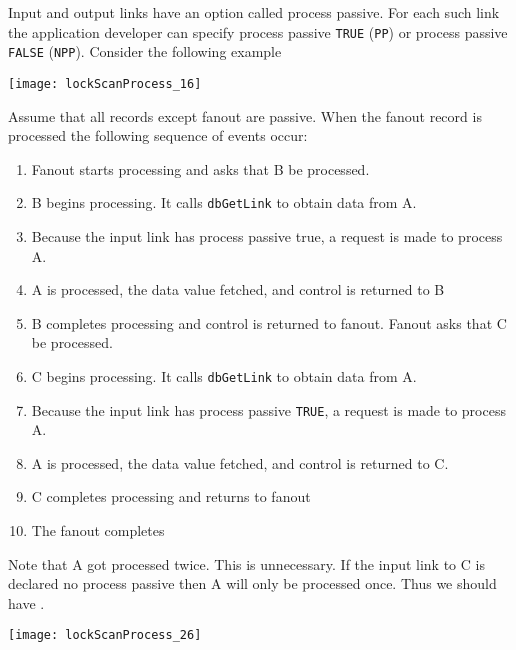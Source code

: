 Input and output links have an option called process passive. For each such link the application developer can specify 
process passive \verb|TRUE| (\verb|PP|) or process passive \verb|FALSE| (\verb|NPP|). Consider the following example 

\begin{center}
\texttt{[image: lockScanProcess\_16]}
\end{center}

Assume that all records except fanout are passive. When the fanout record is processed the following sequence of events 
occur:

\begin{enumerate}
\item Fanout starts processing and asks that B be processed.

\item B begins processing. It calls \verb|dbGetLink| to obtain data from A.

\item Because the input link has process passive true, a request is made to process A.

\item A is processed, the data value fetched, and control is returned to B

\item B completes processing and control is returned to fanout. Fanout asks that C be processed.

\item C begins processing. It calls \verb|dbGetLink| to obtain data from A.

\item Because the input link has process passive \verb|TRUE|, a request is made to process A.

\item A is processed, the data value fetched, and control is returned to C.

\item C completes processing and returns to fanout

\item The fanout completes

\end{enumerate}

Note that A got processed twice. This is unnecessary. If the input link to C is declared no process passive then A will only 
be processed once. Thus we should have .

\begin{center}
\texttt{[image: lockScanProcess\_26]}
\end{center}

